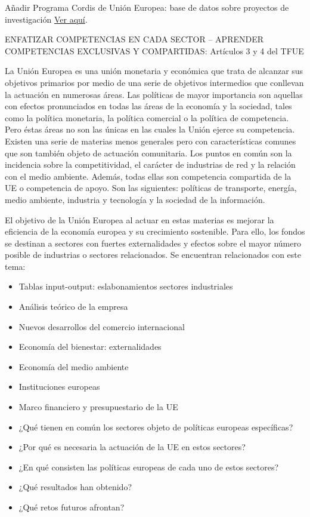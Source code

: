 \documentclass{nuevotema}
\begin{document}
\ideaclave


Añadir Programa Cordis de Unión Europea: base de datos sobre proyectos de investigación \href{https://cordis.europa.eu/en}{Ver aquí}.

ENFATIZAR COMPETENCIAS EN CADA SECTOR -- APRENDER COMPETENCIAS EXCLUSIVAS Y COMPARTIDAS: Artículos 3 y 4 del TFUE

La Unión Europea es una unión monetaria y económica que trata de alcanzar sus objetivos primarios por medio de una serie de objetivos intermedios que conllevan la actuación en numerosas áreas. Las políticas de mayor importancia son aquellas con efectos pronunciados en todas las áreas de la economía y la sociedad, tales como la política monetaria, la política comercial o la política de competencia. Pero éstas áreas no son las únicas en las cuales la Unión ejerce su competencia. Existen una serie de materias menos generales pero con características comunes que son también objeto de actuación comunitaria. Los puntos en común son la incidencia sobre la competitividad, el carácter de industrias de red y la relación con el medio ambiente. Además, todas ellas son competencia compartida de la UE o competencia de apoyo. Son las siguientes: políticas de transporte, energía, medio ambiente, industria y tecnología y la sociedad de la información.

El objetivo de la Unión Europea al actuar en estas materias es mejorar la eficiencia de la economía europea y su crecimiento sostenible. Para ello, los fondos se destinan a sectores con fuertes externalidades y efectos sobre el mayor número posible de industrias o sectores relacionados. Se encuentran relacionados con este tema:

\begin{itemize}
    \item Tablas input-output: eslabonamientos sectores industriales
    \item Análisis teórico de la empresa
    \item Nuevos desarrollos del comercio internacional
    \item Economía del bienestar: externalidades
    \item Economía del medio ambiente
    \item Instituciones europeas
    \item Marco financiero y presupuestario de la UE
\end{itemize}


\begin{itemize}
	\item ¿Qué tienen en común los sectores objeto de políticas europeas específicas?
	\item ¿Por qué es necesaria la actuación de la UE en estos sectores?
	\item ¿En qué consisten las políticas europeas de cada uno de estos sectores?
	\item ¿Qué resultados han obtenido?
	\item ¿Qué retos futuros afrontan?
\end{itemize}
\end{document}
